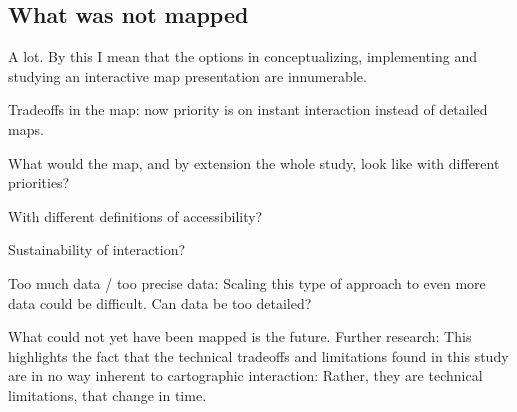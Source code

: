 \subsection{What was not mapped}

A lot. By this I mean that the options in
conceptualizing, implementing and studying an interactive map presentation are innumerable.

Tradeoffs in the map:
now priority is on instant interaction instead of detailed maps.

What would the map, and by extension the whole study, look like with different priorities?

With different definitions of accessibility?

Sustainability of interaction?

Too much data / too precise data:
Scaling this type of approach to even more data could be difficult.
Can data be too detailed?


What could not yet have been mapped is the future.
Further research:
This highlights the fact that the technical tradeoffs and limitations found in this study
are in no way inherent to cartographic interaction:
Rather, they are technical limitations, that change in time.
